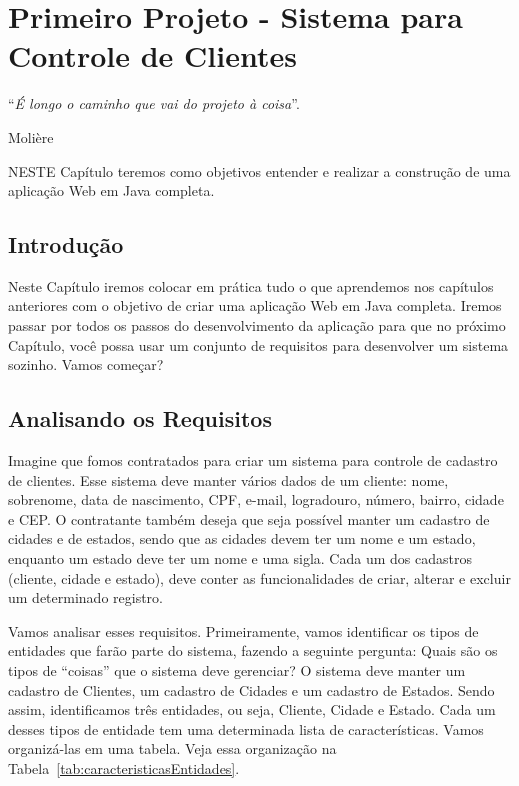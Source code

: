 \chapter{Primeiro Projeto - Sistema para Controle de Clientes}
\epigraph{``\textit{É longo o caminho que vai do projeto à coisa}''.}{Molière}

\lettrine[lines=4, lhang=0.1, lraise=0, loversize=0.2, findent=0.1em]{\textcolor{corAzulTema}{N}}{ESTE} Capítulo teremos como objetivos entender e realizar a construção de uma aplicação Web em Java completa.


\section{Introdução}

Neste Capítulo iremos colocar em prática tudo o que aprendemos nos capítulos anteriores com o objetivo de criar uma aplicação Web em Java completa. Iremos passar por todos os passos do desenvolvimento da aplicação para que no próximo Capítulo, você possa usar um conjunto de requisitos para desenvolver um sistema sozinho. Vamos começar?


\section{Analisando os Requisitos}

Imagine que fomos contratados para criar um sistema para controle de cadastro de clientes. Esse sistema deve manter vários dados de um cliente: nome, sobrenome, data de nascimento, CPF, e-mail, logradouro, número, bairro, cidade e CEP. O contratante também deseja que seja possível manter um cadastro de cidades e de estados, sendo que as cidades devem ter um nome e um estado, enquanto um estado deve ter um nome e uma sigla. Cada um dos cadastros (cliente, cidade e estado), deve conter as funcionalidades de criar, alterar e excluir um determinado registro.

Vamos analisar esses requisitos. Primeiramente, vamos identificar os tipos de entidades que farão parte do sistema, fazendo a seguinte pergunta: Quais são os tipos de ``coisas'' que o sistema deve gerenciar? O sistema deve manter um cadastro de Clientes, um cadastro de Cidades e um cadastro de Estados. Sendo assim, identificamos três entidades, ou seja, Cliente, Cidade e Estado.
Cada um desses tipos de entidade tem uma determinada lista de características. Vamos organizá-las em uma tabela. Veja essa organização na Tabela~\ref{tab:caracteristicasEntidades}.

